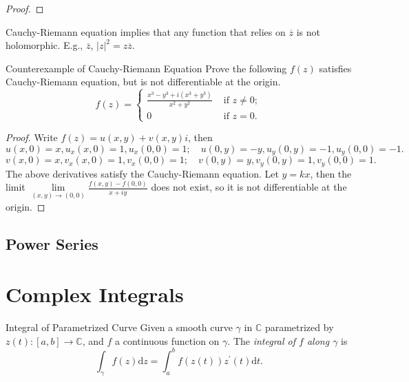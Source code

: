 \begin{proof}
  
\end{proof}

\begin{note}
  Cauchy-Riemann equation implies that any function that relies on
  $\overline{z}$ is not holomorphic.
  E.g., $\overline{z}$, $|z|^2 = z\overline{z}$.
\end{note}

\begin{example}{Counterexample of Cauchy-Riemann Equation}{}
  Prove the following $f(z)$ satisfies Cauchy-Riemann equation,
  but is not differentiable at the origin.
  \begin{equation}
    f(z) =
    \begin{cases}
      \frac{x^3 - y^3 + i(x^3 + y^3)}{x^2 + y^2} & \text{ if } z \neq 0;\\
      0 & \text{ if } z = 0.
    \end{cases}
  \end{equation}
\end{example}

\begin{proof}
  Write $f(z) = u(x,y) + v(x,y)i$, then
  \begin{equation}
    u(x, 0) = x, u_x(x, 0) = 1, u_x(0, 0) = 1; \quad
    u(0, y) = -y, u_y(0, y) = -1, u_y(0, 0) = -1.
  \end{equation}
  \begin{equation}
    v(x,0) = x, v_x(x,0) = 1, v_x(0,0) = 1; \quad
    v(0,y) = y, v_y(0, y) = 1, v_y(0, 0) = 1.
  \end{equation}
  The above derivatives satisfy the Cauchy-Riemann equation.
  Let $y = kx$, then the limit $\lim \limits _{(x,y) \rightarrow (0,0)}\frac{f(x,y) - f(0, 0)}{x+iy}$
  does not exist, so it is not differentiable at the origin.
\end{proof}

\subsection{Power Series}

\section{Complex Integrals}

\begin{definition}{Integral of Parametrized Curve}{}
  Given a smooth curve $\gamma$ in $\mathbb{C}$ parametrized by $z(t):[a,b] \rightarrow \mathbb{C}$,
  and $f$ a continuous function on $\gamma$.
  The \emph{integral of $f$ along $\gamma$} is
  \begin{equation}
    \int_{\gamma} f(z)\mathrm{d} z = \int_a^b f(z(t)) z^{\prime}(t) \mathrm{d} t.
  \end{equation}
\end{definition}

